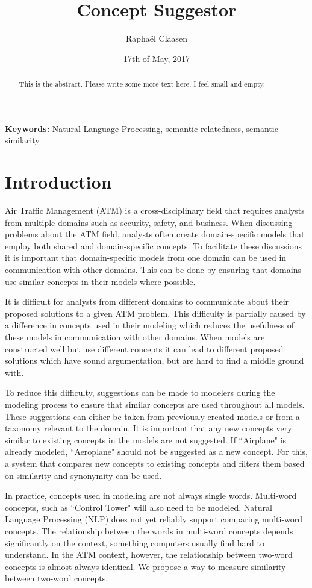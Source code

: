 \documentclass{article}
\title{Concept Suggestor}
\date{17th of May, 2017}
\author{Rapha\"el Claasen}
\begin{document}
\maketitle

\begin{abstract}
This is the abstract. Please write some more text here, I feel small and empty.
\end{abstract}

{\bf Keywords:} Natural Language Processing, semantic relatedness, semantic similarity

\section{Introduction}

Air Traffic Management (ATM) is a cross-disciplinary field that requires analysts from multiple domains such as security, safety, and business. When discussing problems about the ATM field, analysts often create domain-specific models that employ both shared and domain-specific concepts. To facilitate these discussions it is important that domain-specific models from one domain can be used in communication with other domains. This can be done by ensuring that domains use similar concepts in their models where possible.

It is difficult for analysts from different domains to communicate about their proposed solutions to a given ATM problem. This difficulty is partially caused by a difference in concepts used in their modeling which reduces the usefulness of these models in communication with other domains. When models are constructed well but use different concepts it can lead to different proposed solutions which have sound argumentation, but are hard to find a middle ground with.

To reduce this difficulty, suggestions can be made to modelers during the modeling process to ensure that similar concepts are used throughout all models. These suggestions can either be taken from previously created models or from a taxonomy relevant to the domain. 
It is important that any new concepts very similar to existing concepts in the models are not suggested. If ``Airplane" is already modeled, ``Aeroplane" should not be suggested as a new concept. For this, a system that compares new concepts to existing concepts and filters them based on similarity and synonymity can be used.

In practice, concepts used in modeling are not always single words. Multi-word concepts, such as ``Control Tower" will also need to be modeled. Natural Language Processing (NLP) does not yet reliably support comparing multi-word concepts. The relationship between the words in multi-word concepts depends significantly on the context, something computers usually find hard to understand. In the ATM context, however, the relationship between two-word concepts is almost always identical. We propose a way to measure similarity between two-word concepts.
\end{document}
